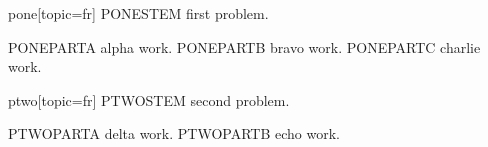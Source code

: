 \begin{problem}{pone}[topic=fr]
	PONESTEM first problem.
	\begin{parts}
		\ppart PONEPARTA alpha work.
		\ppart PONEPARTB bravo work.
		\ppart PONEPARTC charlie work.
	\end{parts}
\end{problem}
\begin{problem}{ptwo}[topic=fr]
	PTWOSTEM second problem.
	\begin{parts}
		\ppart PTWOPARTA delta work.
		\ppart PTWOPARTB echo work.
	\end{parts}
\end{problem}
